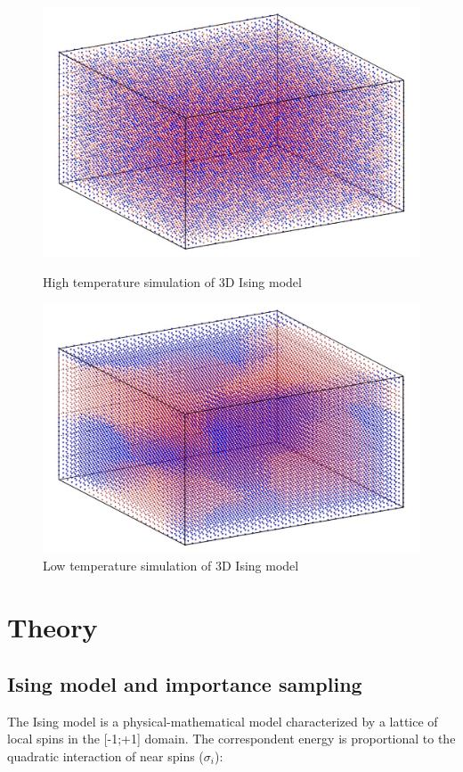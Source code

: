 \documentclass[11pt,a4paper]{article}
\begin{document}
\begin{figure}[h!]
\centering
\includegraphics[scale=0.25]{img/img1_intro.jpg} 
\caption[Source: "monteinsing code" https://inknos.github.io/monteising/]{High temperature simulation of 3D Ising model}
\includegraphics[scale=0.25]{img/img2_intro.jpg} 
\caption[Source: "monteinsing code" https://inknos.github.io/monteising/]{Low temperature simulation of 3D Ising model}
\end{figure}


\newpage 
\section{Theory}
\subsection{Ising model and importance sampling}
The Ising model is a physical-mathematical model characterized by a lattice of local spins in the [-1;+1] domain. The correspondent energy is proportional to the quadratic interaction of near spins ($\sigma_i$): 
\end{document}
